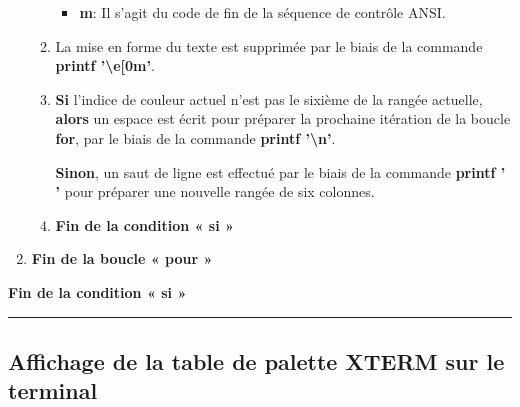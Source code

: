 \documentclass[a4paper,10pt]{article}
\begin{document}
\begin{justify}
\begin{enumerate}
\begin{enumerate}
\begin{itemize}
                    \item \textbf{m}: Il s'agit du code de fin de la séquence de contrôle ANSI.
                \end{itemize}

                \setlength{\parskip}{1em}

                \item La mise en forme du texte est supprimée par le biais de la commande \textbf{\color{cmds}printf '\textbackslash{e}[0m'}.

                \item
                {
                    \textbf{\color{cond}Si} l'indice de couleur actuel n'est pas le sixième de la rangée actuelle, \textbf{\color{cond}alors} un espace est écrit pour préparer la prochaine itération de la boucle \textbf{\color{loop}for}, par le biais de la commande \textbf{\color{cmds}printf '\textbackslash{n}'}.

                    \textbf{\color{cond}Sinon}, un saut de ligne est effectué par le biais de la commande \textbf{\color{cmds}printf ' '} pour préparer une nouvelle rangée de six colonnes.
                }

                \item \textbf{\color{cond}Fin de la condition « si »}
            \end{enumerate}

    	\item \textbf{\color{loop}Fin de la boucle « pour »}

    	\end{enumerate}

    	\item \textbf{\color{cond}Fin de la condition « si »}

    \end{justify}




    \newpage

    \color{sec2}\par\noindent\rule{\textwidth}{0.4pt}\color{text}

    \color{sec2}
    \subsection{Affichage de la table de palette XTERM sur le terminal}\color{text}
\end{document}
